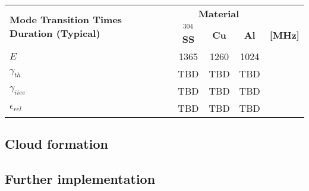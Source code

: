 \begin{table}[h]
  \centering
  \renewcommand{\arraystretch}{1.2}
  \begin{tabular}{|p{5cm}|c|c|c|c|}
    \hline
    \multirow{2}{5cm}{\textbf{Mode Transition Times Duration (Typical)}} & \multicolumn{3}{c|}{\textbf{Material}} \\
    \cline{2-5}
    & \textbf{$^{304}$SS} & \textbf{Cu} & \textbf{Al} & \textbf{[MHz]}\\
    \hline
    $E$ & 1365 & 1260 & 1024 &  \\ \hline
    $\gamma_{th}$ & TBD & TBD & TBD &  \\ \hline
    $\gamma_{iiee}$ & TBD & TBD & TBD & \\ \hline
    $\epsilon_{rel}$ & TBD & TBD & TBD & \\ \hline
  \end{tabular}
\end{table}


\subsection{Cloud formation}

\subsection{Further implementation}